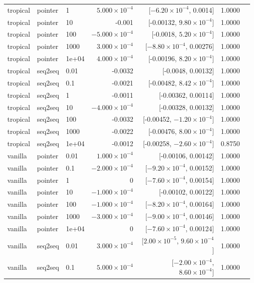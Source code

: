 \documentclass[10pt]{article}
\begin{document}
{\begin{longtable}{lllrrrl}
tropical & pointer & 1 & $5.000\times10^{-4}$ & [$-6.20\times10^{-4}$, 0.0014] & 1.0000 & \\
tropical & pointer & 10 & -0.001 & [-0.00132, $9.80\times10^{-4}$] & 1.0000 & \\
tropical & pointer & 100 & $-5.000\times10^{-4}$ & [-0.0018, $5.20\times10^{-4}$] & 1.0000 & \\
tropical & pointer & 1000 & $3.000\times10^{-4}$ & [$-8.80\times10^{-4}$, 0.00276] & 1.0000 & \\
tropical & pointer & 1e+04 & $4.000\times10^{-4}$ & [-0.00196, $8.20\times10^{-4}$] & 1.0000 & \\
tropical & seq2seq & 0.01 & -0.0032 & [-0.0048, 0.00132] & 1.0000 & \\
tropical & seq2seq & 0.1 & -0.0021 & [-0.00482, $8.42\times10^{-4}$] & 1.0000 & \\
tropical & seq2seq & 1 & -0.0011 & [-0.00362, 0.00114] & 1.0000 & \\
tropical & seq2seq & 10 & $-4.000\times10^{-4}$ & [-0.00328, 0.00132] & 1.0000 & \\
tropical & seq2seq & 100 & -0.0032 & [-0.00452, $-1.20\times10^{-4}$] & 1.0000 & \\
tropical & seq2seq & 1000 & -0.0022 & [-0.00476, $8.00\times10^{-4}$] & 1.0000 & \\
tropical & seq2seq & 1e+04 & -0.0012 & [-0.00258, $-2.60\times10^{-4}$] & 0.8750 & \\
vanilla & pointer & 0.01 & $1.000\times10^{-4}$ & [-0.00106, 0.00142] & 1.0000 & \\
vanilla & pointer & 0.1 & $-2.000\times10^{-4}$ & [$-9.20\times10^{-4}$, 0.00152] & 1.0000 & \\
vanilla & pointer & 1 & 0 & [$-7.60\times10^{-4}$, 0.00154] & 1.0000 & \\
vanilla & pointer & 10 & $-1.000\times10^{-4}$ & [-0.00102, 0.00122] & 1.0000 & \\
vanilla & pointer & 100 & $-1.000\times10^{-4}$ & [$-8.20\times10^{-4}$, 0.00164] & 1.0000 & \\
vanilla & pointer & 1000 & $-3.000\times10^{-4}$ & [$-9.00\times10^{-4}$, 0.00146] & 1.0000 & \\
vanilla & pointer & 1e+04 & 0 & [$-7.60\times10^{-4}$, 0.00124] & 1.0000 & \\
vanilla & seq2seq & 0.01 & $3.000\times10^{-4}$ & [$2.00\times10^{-5}$, $9.60\times10^{-4}$] & 1.0000 & \\
vanilla & seq2seq & 0.1 & $5.000\times10^{-4}$ & [$-2.00\times10^{-4}$, $8.60\times10^{-4}$] & 1.0000 & \\

\end{longtable}}
\end{document}
